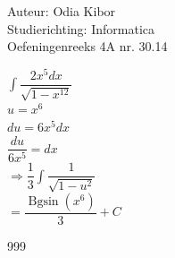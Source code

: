\documentclass[a4paper]{article}
\begin{document}
  
\noindent \large Auteur: Odia Kibor \\
\noindent \large Studierichting: Informatica\\
\noindent \large Oefeningenreeks 4A nr. 30.14\\

\medskip

\normalsize


$\displaystyle\int \dfrac{2x^5 dx}{\sqrt{1 - x^{12}}}$\\

$u = x^6$\\

$du = 6x^5 dx$\\

$\dfrac{du}{6x^5} = dx$\\

$\Rightarrow  \dfrac{1}{3}\displaystyle\int \dfrac{1}{\sqrt{1 - u^2}}$\\

$= \dfrac{\operatorname{Bgsin}(x^6)}{3} + C$\\



















\begin{thebibliography}{999}
\end{thebibliography}
\end{document}
